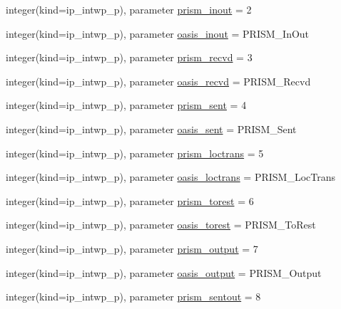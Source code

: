 \begin{DoxyCompactItemize}
integer(kind=ip\+\_\+intwp\+\_\+p), parameter \hyperlink{namespacemod__oasis__parameters_ae8105d0074bcd93e7da5c40331d2b9fe}{prism\+\_\+inout} = 2
\item 
integer(kind=ip\+\_\+intwp\+\_\+p), parameter \hyperlink{namespacemod__oasis__parameters_adc22f0871027f573ac705ca4593519f0}{oasis\+\_\+inout} = P\+R\+I\+S\+M\+\_\+\+In\+Out
\item 
integer(kind=ip\+\_\+intwp\+\_\+p), parameter \hyperlink{namespacemod__oasis__parameters_aa0bc3b208a1f962e5ec08916b36cae2d}{prism\+\_\+recvd} = 3
\item 
integer(kind=ip\+\_\+intwp\+\_\+p), parameter \hyperlink{namespacemod__oasis__parameters_a50fc92036d81ca0ea23918e1feddfe75}{oasis\+\_\+recvd} = P\+R\+I\+S\+M\+\_\+\+Recvd
\item 
integer(kind=ip\+\_\+intwp\+\_\+p), parameter \hyperlink{namespacemod__oasis__parameters_a403c181a893e178ee0ad6ec6f8d26c9c}{prism\+\_\+sent} = 4
\item 
integer(kind=ip\+\_\+intwp\+\_\+p), parameter \hyperlink{namespacemod__oasis__parameters_af739945ec2da833423cdc6e220e1c847}{oasis\+\_\+sent} = P\+R\+I\+S\+M\+\_\+\+Sent
\item 
integer(kind=ip\+\_\+intwp\+\_\+p), parameter \hyperlink{namespacemod__oasis__parameters_af9dc530c2cf2f0e5b5bb04fecb8373dd}{prism\+\_\+loctrans} = 5
\item 
integer(kind=ip\+\_\+intwp\+\_\+p), parameter \hyperlink{namespacemod__oasis__parameters_a8b206cc178182e3526d400ea7a6587b5}{oasis\+\_\+loctrans} = P\+R\+I\+S\+M\+\_\+\+Loc\+Trans
\item 
integer(kind=ip\+\_\+intwp\+\_\+p), parameter \hyperlink{namespacemod__oasis__parameters_a8d037fafc163f46260a8704f92a885a1}{prism\+\_\+torest} = 6
\item 
integer(kind=ip\+\_\+intwp\+\_\+p), parameter \hyperlink{namespacemod__oasis__parameters_a875abcc1cc679cb72f20d42d3dbfac97}{oasis\+\_\+torest} = P\+R\+I\+S\+M\+\_\+\+To\+Rest
\item 
integer(kind=ip\+\_\+intwp\+\_\+p), parameter \hyperlink{namespacemod__oasis__parameters_adc510873316710fd71696fabcc34f336}{prism\+\_\+output} = 7
\item 
integer(kind=ip\+\_\+intwp\+\_\+p), parameter \hyperlink{namespacemod__oasis__parameters_a7f9f81f3b1f2c8b09a460aeca27ea859}{oasis\+\_\+output} = P\+R\+I\+S\+M\+\_\+\+Output
\item 
integer(kind=ip\+\_\+intwp\+\_\+p), parameter \hyperlink{namespacemod__oasis__parameters_a9f683811203a8cf60704b4938a8f3a11}{prism\+\_\+sentout} = 8

\end{DoxyCompactItemize}
